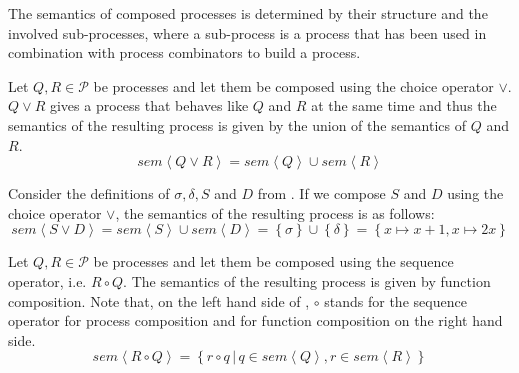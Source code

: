 The semantics of composed processes is determined by their structure and the involved sub-processes, where a sub-process is a process that has been used in combination with process combinators to build a process. 

\begin{definition}
\label{def:sem_choice}
Let $Q, R \in \mathcal{P}$ be processes and let them be composed using the choice operator $\vee$. $Q \vee R$ gives a process that behaves like $Q$ and $R$ at the same time and thus the semantics of the resulting process is given by the union of the semantics of $Q$ and $R$.
  \begin{equation}
    \label{eqn:sem_choice}
    sem \left\langle Q \vee R \right\rangle = sem \left\langle Q \right\rangle \cup sem \left\langle R \right\rangle
  \end{equation}
  \hfill\qedsymbol
\end{definition}

\begin{example}
\label{exp:sem_chice}
Consider the definitions of $\sigma, \delta, S$ and $D$ from . If we compose $S$ and $D$ using the choice operator $\vee$, the semantics of the resulting process is as follows:
  \begin{equation}
    sem \left\langle S \vee D \right\rangle = sem \left\langle S \right\rangle \cup sem \left\langle D \right\rangle = \left\{ \sigma \right\} \cup \left\{ \delta \right\} = \left\{ x \mapsto x+1, x \mapsto 2x \right\}
  \end{equation}
  \hfill\qedsymbol
\end{example}


\begin{definition}
\label{def:sem_sequence}
Let $Q, R \in \mathcal{P}$ be processes and let them be composed using the sequence operator, i.e. $R \circ Q$. The semantics of the resulting process is given by function composition. Note that, on the left hand side of , $\circ$ stands for the sequence operator for process composition and for function composition on the right hand side.
  \begin{equation}
    \label{eqn:sem_sequence}
    sem \left\langle R \circ Q \right\rangle = \left\{ r \circ q \,|\, q \in sem \left\langle Q \right\rangle, r \in sem \left\langle R \right\rangle \right\}
  \end{equation}
  \hfill\qedsymbol
\end{definition}

